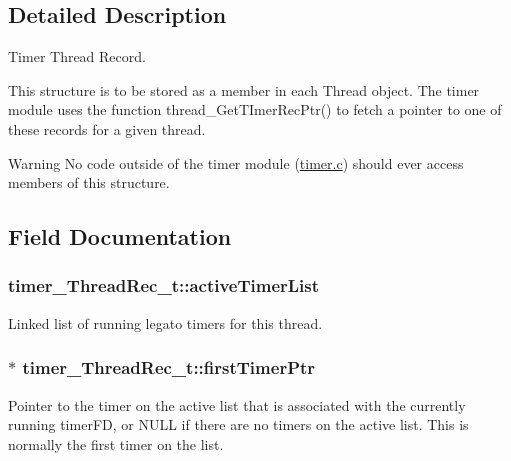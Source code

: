 \subsection{Detailed Description}
Timer Thread Record.

This structure is to be stored as a member in each Thread object. The timer module uses the function thread\+\_\+\+Get\+T\+Imer\+Rec\+Ptr() to fetch a pointer to one of these records for a given thread.

\begin{DoxyWarning}{Warning}
No code outside of the timer module (\hyperlink{timer_8c}{timer.\+c}) should ever access members of this structure. 
\end{DoxyWarning}


\subsection{Field Documentation}
\subsubsection[{\texorpdfstring{active\+Timer\+List}{activeTimerList}}]{ timer\+\_\+\+Thread\+Rec\+\_\+t\+::active\+Timer\+List}\hypertarget{structtimer___thread_rec__t_a56eaf97d404201953bc35a15739d5429}{}\label{structtimer___thread_rec__t_a56eaf97d404201953bc35a15739d5429}


Linked list of running legato timers for this thread. 

\subsubsection[{\texorpdfstring{first\+Timer\+Ptr}{firstTimerPtr}}]{$\ast$ timer\+\_\+\+Thread\+Rec\+\_\+t\+::first\+Timer\+Ptr}\hypertarget{structtimer___thread_rec__t_ae2c2d0c270c81c9faa903c1adf8407ce}{}\label{structtimer___thread_rec__t_ae2c2d0c270c81c9faa903c1adf8407ce}
Pointer to the timer on the active list that is associated with the currently running timer\+FD, or N\+U\+LL if there are no timers on the active list. This is normally the first timer on the list. 
